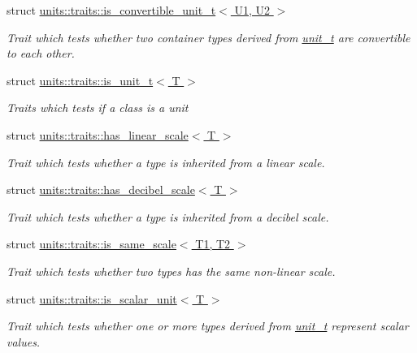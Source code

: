\begin{DoxyCompactItemize}
struct \hyperlink{structunits_1_1traits_1_1is__convertible__unit__t}{units\+::traits\+::is\+\_\+convertible\+\_\+unit\+\_\+t$<$ U1, U2 $>$}
\begin{DoxyCompactList}\small\item\em Trait which tests whether two container types derived from {\ttfamily \hyperlink{classunits_1_1unit__t}{unit\+\_\+t}} are convertible to each other. \end{DoxyCompactList}\item 
struct \hyperlink{structunits_1_1traits_1_1is__unit__t}{units\+::traits\+::is\+\_\+unit\+\_\+t$<$ T $>$}
\begin{DoxyCompactList}\small\item\em Traits which tests if a class is a {\ttfamily unit} \end{DoxyCompactList}\item 
struct \hyperlink{structunits_1_1traits_1_1has__linear__scale}{units\+::traits\+::has\+\_\+linear\+\_\+scale$<$ T $>$}
\begin{DoxyCompactList}\small\item\em Trait which tests whether a type is inherited from a linear scale. \end{DoxyCompactList}\item 
struct \hyperlink{structunits_1_1traits_1_1has__decibel__scale}{units\+::traits\+::has\+\_\+decibel\+\_\+scale$<$ T $>$}
\begin{DoxyCompactList}\small\item\em Trait which tests whether a type is inherited from a decibel scale. \end{DoxyCompactList}\item 
struct \hyperlink{structunits_1_1traits_1_1is__same__scale}{units\+::traits\+::is\+\_\+same\+\_\+scale$<$ T1, T2 $>$}
\begin{DoxyCompactList}\small\item\em Trait which tests whether two types has the same non-\/linear scale. \end{DoxyCompactList}\item 
struct \hyperlink{structunits_1_1traits_1_1is__scalar__unit}{units\+::traits\+::is\+\_\+scalar\+\_\+unit$<$ T $>$}
\begin{DoxyCompactList}\small\item\em Trait which tests whether one or more types derived from {\ttfamily \hyperlink{classunits_1_1unit__t}{unit\+\_\+t}} represent scalar values. \end{DoxyCompactList}\item 

\end{DoxyCompactItemize}

